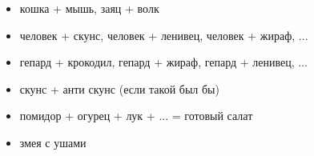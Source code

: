 \begin{itemize}
\item кошка + мышь, заяц + волк
\item человек + скунс, человек + ленивец, человек + жираф, ...
\item гепард + крокодил, гепард + жираф, гепард + ленивец, ...
\item скунс + анти скунс (если такой был бы)
\item помидор + огурец + лук + ... = готовый салат
\item змея с ушами

\end{itemize}
